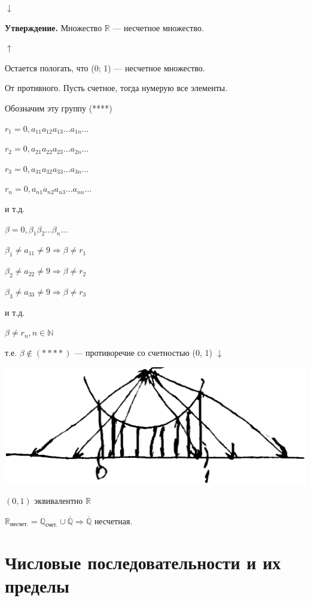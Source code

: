 \documentclass{article}
\begin{document}
        $\downarrow$

        \textbf{Утверждение.} Множество $\mathbb{R}$ --- несчетное множество.

        $\uparrow$

        Остается пологать, что (0; 1) --- несчетное множество.

        От противного. Пусть счетное, тогда нумерую все элементы.

        Обозначим эту группу (****)

        $r_1 = 0,a_{11}a_{12}a_{13}...a_{1n}...$

        $r_2 = 0,a_{21}a_{22}a_{23}...a_{2n}...$

        $r_3 = 0,a_{31}a_{32}a_{33}...a_{3n}...$

        $r_n = 0,a_{n1}a_{n2}a_{n3}...a_{nn}...$

        и т.д.

        $\beta = 0,\beta_1\beta_2...\beta_n...$

        $\beta_1 \neq a_{11} \neq 9 \Rightarrow \beta \neq r_1$
        
        $\beta_2 \neq a_{22} \neq 9 \Rightarrow \beta \neq r_2$
        
        $\beta_3 \neq a_{33} \neq 9 \Rightarrow \beta \neq r_3$

        и т.д.

        $\beta \neq r_n, n \in \mathbb{N}$

        т.е. $\beta \not\in (****)$ --- противоречие со счетностью (0, 1) $\downarrow$

        \includegraphics[scale=0.15]{d_ch_8_2}

        $(0, 1)$ эквивалентно $\mathbb{R}$

        $\mathbb{R}_{\textrm{несчет.}} = \mathbb{Q}_{\textrm{счет.}} \cup \overline{\mathbb{Q}} \Rightarrow \overline{\mathbb{Q}}$ несчетная.


    \section{Числовые последовательности и их пределы}
    
\end{document}
